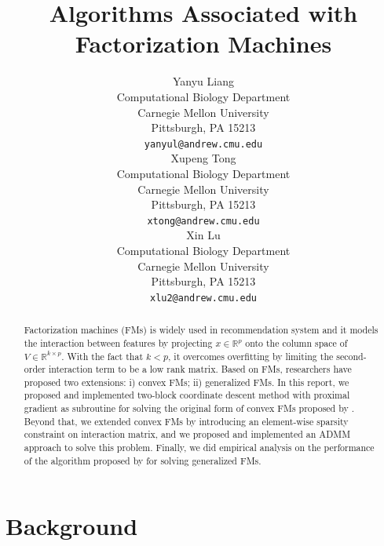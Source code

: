 \documentclass{article}
\title{Algorithms Associated with Factorization Machines}
\author{
  Yanyu Liang \\
  Computational Biology Department\\
  Carnegie Mellon University\\
  Pittsburgh, PA 15213 \\
  \texttt{yanyul@andrew.cmu.edu} \\
  \And
  Xupeng Tong \\
  Computational Biology Department\\
  Carnegie Mellon University\\
  Pittsburgh, PA 15213 \\
  \texttt{xtong@andrew.cmu.edu} \\
  \AND
  Xin Lu \\
  Computational Biology Department\\
  Carnegie Mellon University\\
  Pittsburgh, PA 15213 \\
  \texttt{xlu2@andrew.cmu.edu} \\
}
\begin{document}

\maketitle

\begin{abstract}
  Factorization machines (FMs) is widely used in recommendation system and it models the interaction between features by projecting $x \in \mathbb{R}^{p}$ onto the column space of $V \in \mathbb{R}^{k \times p}$. With the fact that $k < p$, it overcomes overfitting by limiting the second-order interaction term to be a low rank matrix. Based on FMs, researchers have proposed two extensions: i) convex FMs; ii) generalized FMs. In this report, we proposed and implemented two-block coordinate descent method with proximal gradient as subroutine for solving the original form of convex FMs proposed by \cite{convexFM_paper}. Beyond that, we extended convex FMs by introducing an element-wise sparsity constraint on interaction matrix, and we proposed and implemented an ADMM approach to solve this problem. Finally, we did empirical analysis on the performance of the algorithm proposed by \cite{generalizedFM_paper} for solving generalized FMs.
\end{abstract}

\section{Background}
\end{document}
